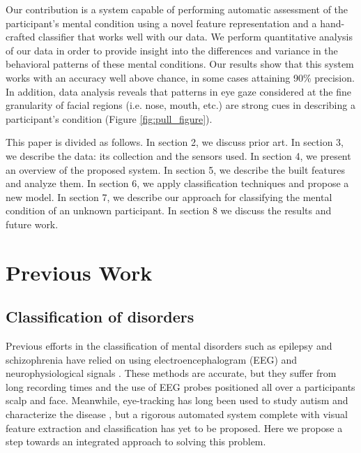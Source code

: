 \documentclass[10pt,twocolumn,letterpaper]{article}
\begin{document}
Our contribution is a system capable of performing automatic assessment of the participant's mental condition using a novel feature representation and a hand-crafted classifier that works well with our data. We perform quantitative analysis of our data in order to provide insight into the differences and variance in the behavioral patterns of these mental conditions. Our results show that this system works with an accuracy well above chance, in some cases attaining 90\% precision. In addition, data analysis reveals that patterns in eye gaze considered at the fine granularity of facial regions (i.e. nose, mouth, etc.) are strong cues in describing a participant's condition (Figure \ref{fig:pull_figure}). 

This paper is divided as follows. In section 2, we discuss prior art. In section 3, we describe the data: its collection and the sensors used. In section 4, we present an overview of the proposed system. In section 5, we describe the built features and analyze them. In section 6, we apply classification techniques and propose a new model. In section 7, we describe our approach for classifying the mental condition of an unknown participant. In section 8 we discuss the results and future work.

\section {Previous Work}

\subsection{Classification of disorders} Previous efforts in the classification of mental disorders such as epilepsy and schizophrenia have relied on using electroencephalogram (EEG) and neurophysiological signals \cite{Kumar, sabeti}. These methods are accurate, but they suffer from long recording times and the use of EEG probes positioned all over a participants scalp and face. Meanwhile, eye-tracking has long been used to study autism and characterize the disease \cite{Boraston, hashemi, dalton}, but a rigorous automated system complete with visual feature extraction and classification has yet to be proposed. Here we propose a step towards an integrated approach to solving this problem. 
\end{document}
